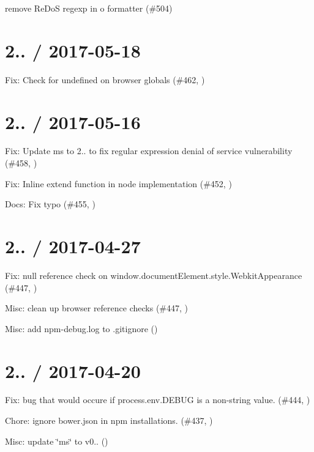 
\begin{DoxyItemize}
\item remove Re\+DoS regexp in o formatter (\#504)
\end{DoxyItemize}

\section*{2.. / 2017-\/05-\/18 }


\begin{DoxyItemize}
\item Fix\+: Check for undefined on browser globals (\#462, )
\end{DoxyItemize}

\section*{2.. / 2017-\/05-\/16 }


\begin{DoxyItemize}
\item Fix\+: Update ms to 2.. to fix regular expression denial of service vulnerability (\#458, )
\item Fix\+: Inline extend function in node implementation (\#452, )
\item Docs\+: Fix typo (\#455, )
\end{DoxyItemize}

\section*{2.. / 2017-\/04-\/27 }


\begin{DoxyItemize}
\item Fix\+: null reference check on window.\+document\+Element.\+style.\+Webkit\+Appearance (\#447, )
\item Misc\+: clean up browser reference checks (\#447, )
\item Misc\+: add npm-\/debug.\+log to .gitignore ()
\end{DoxyItemize}

\section*{2.. / 2017-\/04-\/20 }


\begin{DoxyItemize}
\item Fix\+: bug that would occure if process.\+env.\+D\+E\+B\+UG is a non-\/string value. (\#444, )
\item Chore\+: ignore bower.\+json in npm installations. (\#437, )
\item Misc\+: update \char`\"{}ms\char`\"{} to v0.. ()
\end{DoxyItemize}

